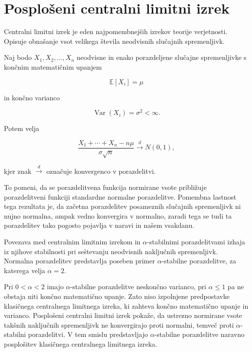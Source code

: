 \documentclass[a4paper, 12pt, openany]{book}
\begin{document}
\section{Posplošeni centralni limitni izrek}


Centralni limitni izrek je eden najpomembnejših izrekov teorije verjetnosti. Opisuje obnašanje vsot velikega števila neodvisnih slučajnih spremenljivk.
\begin{tcolorbox}[colback=blue!5!white,colframe=blue!50!black,title=Definicija 5: Centralni limitni izrek (CLI)]
\label{def:CLI}
Naj bodo $X_1,X_2,\dots,X_n$ neodvisne in enako porazdeljene slučajne spremenljivke s končnim matematičnim upanjem

\[
\mathbb{E}[X_i]=\mu
\]

in končno varianco

\[
\operatorname{Var}(X_i)=\sigma^2<\infty.
\]

Potem velja

\[
\frac{X_1+\cdots+X_n-n\mu}{\sigma\sqrt{n}}
\overset{d}{\longrightarrow}
N(0,1),
\]

kjer znak $\overset{d}{\longrightarrow}$ označuje konvergenco v porazdelitvi. 
\end{tcolorbox}
\begin{tcolorbox}[colback=yellow!5!white, colframe=orange!70!black, title=\textbf{Intuicija}, fonttitle=\bfseries]
To pomeni, da se porazdelitvena funkcija normirane vsote približuje porazdelitveni funkciji standardne normalne porazdelitve. Pomembna lastnost tega rezultata je, da začetna porazdelitev posameznih slučajnih spremenljivk ni nujno normalna, ampak vedno konvergira v normalno, zaradi tega se tudi ta porazdelitev tako pogosto pojavlja v naravi in našem vsakdanu.
\end{tcolorbox}

Povezava med centralnim limitnim izrekom in $\alpha$-stabilnimi porazdelitvami izhaja iz njihove stabilnosti pri seštevanju neodvisnih naključnih spremenljivk. Normalna porazdelitev predstavlja poseben primer $\alpha$-stabilne porazdelitve, za katerega velja $\alpha=2$.

Pri $0<\alpha<2$ imajo $\alpha$-stabilne porazdelitve neskončno varianco, pri $\alpha\leq1$ pa ne obstaja niti končno matematično upanje. Zato niso izpolnjene predpostavke klasičnega centralnega limitnega izreka, ki zahteva končno matematično upanje in varianco. Posplošeni centralni limitni izrek pokaže, da ustrezno normirane vsote takšnih naključnih spremenljivk ne konvergirajo proti normalni, temveč proti $\alpha$-stabilni porazdelitvi. V tem smislu predstavljajo $\alpha$-stabilne porazdelitve naravno posplošitev klasičnega centralnega limitnega izreka.
\end{document}

